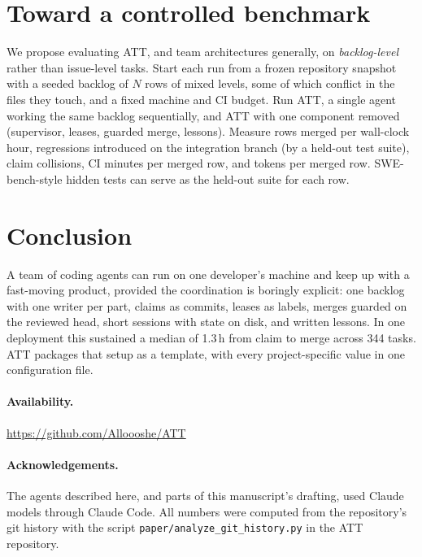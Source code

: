 \documentclass[11pt]{article}
\begin{document}
\section{Toward a controlled benchmark}\label{sec:future}
We propose evaluating ATT, and team architectures generally, on
\emph{backlog-level} rather than issue-level tasks. Start each run from a
frozen repository snapshot with a seeded backlog of $N$ rows of mixed levels,
some of which conflict in the files they touch, and a fixed machine and CI
budget. Run ATT, a single agent working the same backlog sequentially, and ATT
with one component removed (supervisor, leases, guarded merge, lessons).
Measure rows merged per wall-clock hour, regressions introduced on the
integration branch (by a held-out test suite), claim collisions, CI minutes per
merged row, and tokens per merged row. SWE-bench-style hidden tests can serve
as the held-out suite for each row.

\section{Conclusion}
A team of coding agents can run on one developer's machine and keep up with a
fast-moving product, provided the coordination is boringly explicit: one
backlog with one writer per part, claims as commits, leases as labels, merges
guarded on the reviewed head, short sessions with state on disk, and written
lessons. In one deployment this sustained a median of 1.3\,h from claim to
merge across 344 tasks. ATT packages that setup as a template, with every
project-specific value in one configuration file.

\paragraph{Availability.} \url{https://github.com/Alloooshe/ATT}

\paragraph{Acknowledgements.} The agents described here, and parts of this
manuscript's drafting, used Claude models through Claude Code. All numbers were
computed from the repository's git history with the script
\texttt{paper/analyze\_git\_history.py} in the ATT repository.



\end{document}
